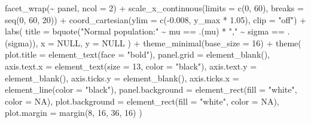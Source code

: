 \documentclass[
  letterpaper,
  DIV=11,
  numbers=noendperiod]{scrreprt}
\newenvironment{Shaded}{\begin{snugshade}}{\end{snugshade}}
\newcommand{\AttributeTok}[1]{\textcolor[rgb]{0.40,0.45,0.13}{#1}}
\newcommand{\ConstantTok}[1]{\textcolor[rgb]{0.56,0.35,0.01}{#1}}
\newcommand{\DecValTok}[1]{\textcolor[rgb]{0.68,0.00,0.00}{#1}}
\newcommand{\FloatTok}[1]{\textcolor[rgb]{0.68,0.00,0.00}{#1}}
\newcommand{\FunctionTok}[1]{\textcolor[rgb]{0.28,0.35,0.67}{#1}}
\newcommand{\NormalTok}[1]{\textcolor[rgb]{0.00,0.23,0.31}{#1}}
\newcommand{\SpecialCharTok}[1]{\textcolor[rgb]{0.37,0.37,0.37}{#1}}
\newcommand{\StringTok}[1]{\textcolor[rgb]{0.13,0.47,0.30}{#1}}
\begin{document}
\begin{Shaded}
\begin{Highlighting}[]
  \FunctionTok{facet\_wrap}\NormalTok{(}\SpecialCharTok{\textasciitilde{}}\NormalTok{ panel, }\AttributeTok{ncol =} \DecValTok{2}\NormalTok{) }\SpecialCharTok{+}
  \FunctionTok{scale\_x\_continuous}\NormalTok{(}\AttributeTok{limits =} \FunctionTok{c}\NormalTok{(}\DecValTok{0}\NormalTok{, }\DecValTok{60}\NormalTok{), }\AttributeTok{breaks =} \FunctionTok{seq}\NormalTok{(}\DecValTok{0}\NormalTok{, }\DecValTok{60}\NormalTok{, }\DecValTok{20}\NormalTok{)) }\SpecialCharTok{+}
  \FunctionTok{coord\_cartesian}\NormalTok{(}\AttributeTok{ylim =} \FunctionTok{c}\NormalTok{(}\SpecialCharTok{{-}}\FloatTok{0.008}\NormalTok{, y\_max }\SpecialCharTok{*} \FloatTok{1.05}\NormalTok{), }\AttributeTok{clip =} \StringTok{"off"}\NormalTok{) }\SpecialCharTok{+}
  \FunctionTok{labs}\NormalTok{(}
    \AttributeTok{title =} \FunctionTok{bquote}\NormalTok{(}\StringTok{"Normal population:"} \SpecialCharTok{\textasciitilde{}}\NormalTok{ mu }\SpecialCharTok{==}\NormalTok{ .(mu) }\SpecialCharTok{*} \StringTok{","} \SpecialCharTok{\textasciitilde{}}\NormalTok{ sigma }\SpecialCharTok{==}\NormalTok{ .(sigma)),}
    \AttributeTok{x =} \ConstantTok{NULL}\NormalTok{, }\AttributeTok{y =} \ConstantTok{NULL}
\NormalTok{  ) }\SpecialCharTok{+}
  \FunctionTok{theme\_minimal}\NormalTok{(}\AttributeTok{base\_size =} \DecValTok{16}\NormalTok{) }\SpecialCharTok{+}
  \FunctionTok{theme}\NormalTok{(}
    \AttributeTok{plot.title   =} \FunctionTok{element\_text}\NormalTok{(}\AttributeTok{face =} \StringTok{"bold"}\NormalTok{),}
    \AttributeTok{panel.grid   =} \FunctionTok{element\_blank}\NormalTok{(),}
    \AttributeTok{axis.text.x  =} \FunctionTok{element\_text}\NormalTok{(}\AttributeTok{size =} \DecValTok{13}\NormalTok{, }\AttributeTok{color =} \StringTok{"black"}\NormalTok{),}
    \AttributeTok{axis.text.y  =} \FunctionTok{element\_blank}\NormalTok{(),}
    \AttributeTok{axis.ticks.y =} \FunctionTok{element\_blank}\NormalTok{(),}
    \AttributeTok{axis.ticks.x =} \FunctionTok{element\_line}\NormalTok{(}\AttributeTok{color =} \StringTok{"black"}\NormalTok{),}
    \AttributeTok{panel.background =} \FunctionTok{element\_rect}\NormalTok{(}\AttributeTok{fill =} \StringTok{"white"}\NormalTok{, }\AttributeTok{color =} \ConstantTok{NA}\NormalTok{),}
    \AttributeTok{plot.background  =} \FunctionTok{element\_rect}\NormalTok{(}\AttributeTok{fill =} \StringTok{"white"}\NormalTok{, }\AttributeTok{color =} \ConstantTok{NA}\NormalTok{),}
    \AttributeTok{plot.margin      =} \FunctionTok{margin}\NormalTok{(}\DecValTok{8}\NormalTok{, }\DecValTok{16}\NormalTok{, }\DecValTok{36}\NormalTok{, }\DecValTok{16}\NormalTok{)}
\NormalTok{  )}
\end{Highlighting}
\end{Shaded}
\end{document}
